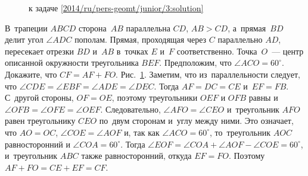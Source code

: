 \ifsolution
\begin{figure}\centering
    \caption{к задаче \ref{2014/ru/pers-geomt/junior/3:solution}}
    \label{2014/ru/pers-geomt/junior/3:solution:fig}
\end{figure}%
\fi %

\problem
В~трапеции $ABCD$ сторона~$AB$ параллельна $CD$, $AB > CD$, а~прямая~$BD$
делит угол $\angle ADC$ пополам.
Прямая, проходящая через $C$ параллельно $AD$, пересекает отрезки $BD$ и~$AB$
в~точках $E$ и~$F$ соответственно.
Точка~$O$~--- центр описанной окружности треугольника $BEF$.
Предположим, что $\angle ACO = 60^{\circ}$.
Докажите, что $CF = AF + FO$.
\solution
\label{2014/ru/pers-geomt/junior/3:solution}%
Рис.~\ref{2014/ru/pers-geomt/junior/3:solution:fig}.
Заметим, что из~параллельности следует, что
$\angle CDE = \angle EBF = \angle ADE = \angle DEC$.
Тогда $AF = DC = CE$ и~$EF = FB$.
С~другой стороны, $OF = OE$, поэтому треугольники $OEF$ и $OFB$ равны
и~$\angle OFB = \angle OFE = \angle OEF$.
Следовательно, $\angle AFO = \angle CEO$ и~треугольник $AFO$ равен
треугольнику $CEO$ по~двум сторонам и~углу между ними.
Это означает, что $AO = OC$, $\angle COE = \angle AOF$ и, так как
$\angle ACO = 60^\circ$, то~треугольник $AOC$ равносторонний и
$\angle COA = 60^\circ$.
Тогда $\angle EOF = \angle COA + \angle AOF - \angle COE = 60^\circ$,
и~треугольник $ABC$ также равносторонний, откуда $EF = FO$.
Поэтому $AF + FO = CE + EF = CF$.
\endproblem
